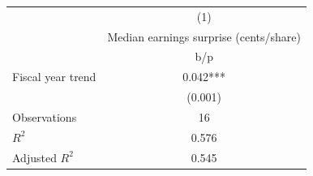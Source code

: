 {
\def\sym#1{\ifmmode^{#1}\else\(^{#1}\)\fi}
\begin{tabular}{l*{1}{c}}
\hline\hline
                    &\multicolumn{1}{c}{(1)}\\
                    &\multicolumn{1}{c}{Median earnings surprise (cents/share)}\\
                    &         b/p   \\
\hline
Fiscal year trend   &       0.042***\\
                    &     (0.001)   \\
\hline
Observations        &          16   \\
\(R^{2}\)           &       0.576   \\
Adjusted \(R^{2}\)  &       0.545   \\
\hline\hline
\end{tabular}
}
